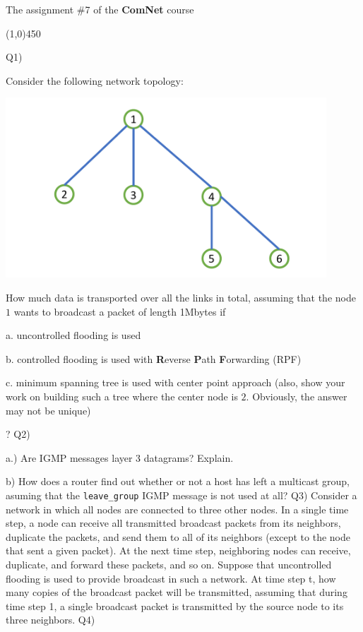 \documentclass[10pt,letterpaper]{article}
\newcommand{\hl}{
\begin{center}
\line(1,0){450}
\end{center}}
\begin{document}
\Large
\begin{center}
The assignment \#7 of the \textbf{ComNet} course
\hl
\end{center}
Q1) 

Consider the following network topology:
\begin{center}
\includegraphics[width=120mm]{Q1_HW7}
\end{center}
How much data is transported over all the links in total, assuming that the node $1$ wants to broadcast a packet of length 1Mbytes if

a. uncontrolled flooding is used

b. controlled flooding is used with \textbf{R}everse \textbf{P}ath \textbf{F}orwarding (RPF)

c. minimum spanning tree is used with center point approach (also, show your work on building such a tree where the center node is $2$. Obviously, the answer may not be unique)

?
\newline
\newline
Q2)

a.) Are IGMP messages layer 3 datagrams? Explain.

b) How does a router find out whether or not a host has left a multicast group, asuming that the \texttt{leave\_group} IGMP message is not used at all?
\newline
\newline
Q3) Consider a network in which all nodes are connected to three other nodes. In a single time step, a node can receive all transmitted broadcast packets from its neighbors, duplicate the packets, and send them to all of its neighbors (except to the node that sent a given packet). At the next time step, neighboring nodes can receive, duplicate, and forward these packets, and so on. Suppose that uncontrolled flooding is used to provide broadcast in such a network. At time step t, how many copies of the broadcast packet will be transmitted, assuming that during time step 1, a single broadcast packet is transmitted by the source node to its three neighbors.
\newline
\newline
Q4)
\end{document}
